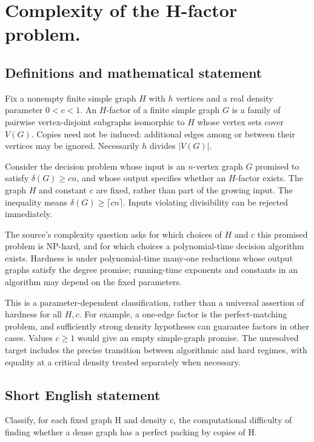 \documentclass[11pt,a4paper]{article}
\begin{document}
\section*{Complexity of the H-factor problem.}\label{statement}

\subsection{Definitions and mathematical statement}
Fix a nonempty finite simple graph $H$ with $h$ vertices and a real density parameter $0<c<1$. An $H$-factor of a finite simple graph $G$ is a family of pairwise vertex-disjoint subgraphs isomorphic to $H$ whose vertex sets cover $V(G)$. Copies need not be induced: additional edges among or between their vertices may be ignored. Necessarily $h$ divides $|V(G)|$.

Consider the decision problem whose input is an $n$-vertex graph $G$ promised to satisfy $\delta(G)\ge cn$, and whose output specifies whether an $H$-factor exists. The graph $H$ and constant $c$ are fixed, rather than part of the growing input. The inequality means $\delta(G)\ge\lceil cn\rceil$. Inputs violating divisibility can be rejected immediately.

The source’s complexity question asks for which choices of $H$ and $c$ this promised problem is NP-hard, and for which choices a polynomial-time decision algorithm exists. Hardness is under polynomial-time many-one reductions whose output graphs satisfy the degree promise; running-time exponents and constants in an algorithm may depend on the fixed parameters.

This is a parameter-dependent classification, rather than a universal assertion of hardness for all $H,c$. For example, a one-edge factor is the perfect-matching problem, and sufficiently strong density hypotheses can guarantee factors in other cases. Values $c\ge1$ would give an empty simple-graph promise. The unresolved target includes the precise transition between algorithmic and hard regimes, with equality at a critical density treated separately when necessary.
\subsection{Short English statement}
Classify, for each fixed graph H and density c, the computational difficulty of finding whether a dense graph has a perfect packing by copies of H.
\end{document}
